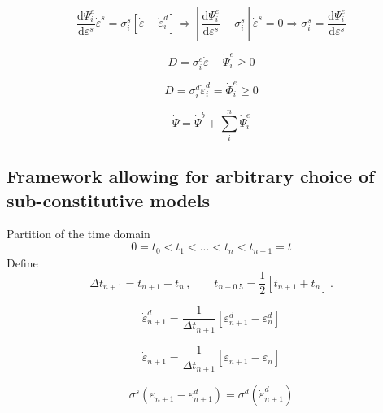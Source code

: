 \documentclass[12pt]{article}
\newcommand{\der}[2]{\dfrac{\text{d} #1}{\text{d} #2}}
\begin{document}
\begin{equation}
	\der{\Psi^{e}_{i}}{\varepsilon^{s}}\dot{\varepsilon}^{s} = \sigma^{s}_{i}\left[\dot{\varepsilon}-\dot{\varepsilon}_{i}^{d}\right] \Rightarrow \left[\der{\Psi^{e}_{i}}{\varepsilon^{s}} - \sigma^{s}_{i}\right]\dot{\varepsilon}^{s} = 0 \Rightarrow \sigma^{s}_{i} = \der{\Psi^{e}_{i}}{\varepsilon^{s}}
\end{equation}

\begin{equation}
	D = \sigma^{e}_{i}\dot{\varepsilon} - \dot{\Psi}^{e}_{i} \geq 0 
\end{equation}

\begin{equation}
	D = \sigma^{d}_{i}\dot{\varepsilon}_{i}^{d} = \dot{\Phi}^{e}_{i} \geq 0 
\end{equation}

\begin{equation}
	\dot{\Psi} = \dot{\Psi}^{b} + \sum_{i}^{n}  \dot{\Psi}^{e}_{i}
\end{equation}

\subsection{Framework allowing for arbitrary choice of sub-constitutive models}

Partition of the time domain
\begin{equation}
	0 = t_{0} < t_{1} < ... < t_{n} < t_{n+1} = t
\end{equation}
Define
\begin{equation}
	\Delta t_{n+1} = t_{n+1} - t_{n}\,, \qquad t_{n+0.5} = \dfrac{1}{2}\left[t_{n+1} + t_{n}\right]\,.
\end{equation}

\begin{equation}
	\dot{\varepsilon}_{n+1}^{d} = \dfrac{1}{\Delta t_{n+1}}\left[\varepsilon_{n+1}^{d} - \varepsilon_{n}^{d}\right]
\end{equation}

\begin{equation}
	\dot{\varepsilon}_{n+1} = \dfrac{1}{\Delta t_{n+1}}\left[\varepsilon_{n+1} - \varepsilon_{n}\right]
\end{equation}

\begin{equation}
	\sigma^{s}(\varepsilon_{n+1} - \varepsilon_{n+1}^{d}) = \sigma^{d}\left(\dot{\varepsilon}_{n+1}^{d}\right)
\end{equation}
\end{document}
